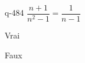 \begin{truefalse}{q-484}
$\dfrac{n+1}{n^2-1} =\dfrac{1}{n-1}$
\item* Vrai
\item Faux
\end{truefalse}


